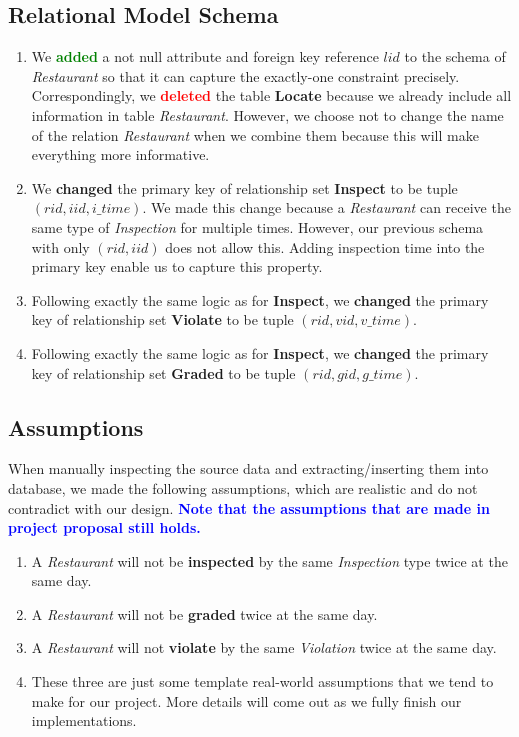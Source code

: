 \documentclass[a4paper,12pt]{article}
\theoremstyle{definition}
\begin{document}
\subsection{Relational Model Schema}
\begin{enumerate}
\item We \textcolor{Green}{\textbf{added}} a not null attribute and foreign key reference $lid$ to the schema of \textit{Restaurant} so that it can capture the exactly-one constraint precisely. Correspondingly, we \textcolor{Red}{\textbf{deleted}} the table \textbf{Locate} because we already include all information in table \textit{Restaurant}. However, we choose not to change the name of the relation \textit{Restaurant} when we combine them because this will make everything more informative.
    \item We \textcolor{NavyBlue}{\textbf{changed}} the primary key of relationship set \textbf{Inspect} to be tuple $(rid, iid, i\_time)$. We made this change because a \textit{Restaurant} can receive the same type of \textit{Inspection} for multiple times. However, our previous schema with only $(rid, iid)$ does not allow this. Adding inspection time into the primary key enable us to capture this property.
    \item Following exactly the same logic as for \textbf{Inspect}, we \textcolor{NavyBlue}{\textbf{changed}} the primary key of relationship set \textbf{Violate} to be tuple $(rid, vid, v\_time)$.
    \item Following exactly the same logic as for \textbf{Inspect}, we \textcolor{NavyBlue}{\textbf{changed}} the primary key of relationship set \textbf{Graded} to be tuple $(rid, gid, g\_time)$.
\end{enumerate}
\subsection{Assumptions}
When manually inspecting the source data and extracting/inserting them into database, we made the following assumptions, which are realistic and do not contradict with our design. \textcolor{Blue}{\textbf{Note that the assumptions that are made in project proposal still holds.}}
\begin{enumerate}
    \item A \textit{Restaurant} will not be \textbf{inspected} by the same \textit{Inspection} type twice at the same day.
    \item A \textit{Restaurant} will not be \textbf{graded} twice at the same day.
    \item A \textit{Restaurant} will not \textbf{violate} by the same \textit{Violation} twice at the same day.
    \item These three are just some template real-world assumptions that we tend to make for our project. More details will come out as we fully finish our implementations.
\end{enumerate}
\end{document}
